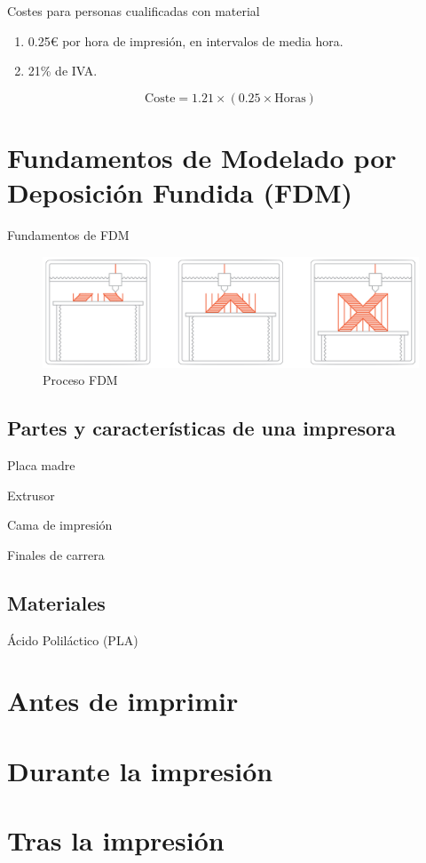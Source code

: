 \documentclass{beamer}
\begin{document}
	\begin{frame}{Costes para personas cualificadas con material}
		\begin{enumerate}
			\item 0.25€ por hora de impresión, en intervalos de media hora.
			\item 21\% de IVA.
		\end{enumerate}
		$$\text{Coste}=1.21\times \left( 0.25\times\text{Horas} \right)$$
	\end{frame}
	
	\section{Fundamentos de Modelado por Deposición Fundida (FDM)}
	\begin{frame}{Fundamentos de FDM}
		\begin{figure}
			\includegraphics[width=\textwidth]{images/fdm}
			\caption{Proceso FDM}
		\end{figure}
	\end{frame}
	
	\subsection{Partes y características de una impresora}
	\begin{frame}{Placa madre}
	\end{frame}
	\begin{frame}{Extrusor}
	\end{frame}
	\begin{frame}{Cama de impresión}
	\end{frame}
	\begin{frame}{Finales de carrera}
	\end{frame}
	
	\subsection{Materiales}
	\begin{frame}{Ácido Poliláctico (PLA)}
		
	\end{frame}
	
	\section{Antes de imprimir}
	
	\section{Durante la impresión}
	
	\section{Tras la impresión}
\end{document}

